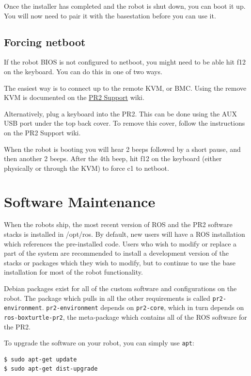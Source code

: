 Once the installer has completed and the robot is shut down, you can
boot it up.  You will now need to pair it with the basestation before
you can use it.

\subsection{Forcing netboot}

If the robot BIOS is not configured to netboot, you might need to be
able hit f12 on the keyboard.  You can do this in one of two ways.

The easiest way is to connect up to the remote KVM, or BMC. Using the remove 
KVM is documented on the \href{http://pr2support.willowgarage.com}{PR2 Support}
wiki.

Alternatively, plug a keyboard into the PR2.  This can be done using
the AUX USB port under the top back cover.  To remove this cover, follow
the instructions on the PR2 Support wiki.

When the robot is booting you will hear 2 beeps followed by a short
pause, and then another 2 beeps.  After the 4th beep, hit f12 on the
keyboard (either physically or through the KVM) to force c1 to netboot.


\section{Software Maintenance}

When the robots ship, the most recent version of ROS and the PR2
software stacks is installed in /opt/ros.  By default, new users will
have a ROS installation which references the pre-installed code.
Users who wish to modify or replace a part of the system are
recommended to install a development version of the stacks or packages
which they wish to modify, but to continue to use the base
installation for most of the robot functionality.

Debian packages exist for all of the custom software and
configurations on the robot.  The package which pulls in all the other
requirements is called \texttt{pr2-environment}.
\texttt{pr2-environment} depends on \texttt{pr2-core}, which in turn
depends on \texttt{ros-boxturtle-pr2}, the meta-package which contains
all of the ROS software for the PR2.

To upgrade the software on your robot, you can simply use \texttt{apt}:

\begin{verbatim}
$ sudo apt-get update
$ sudo apt-get dist-upgrade
\end{verbatim}

